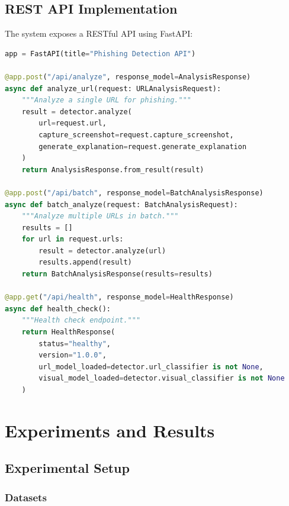 \documentclass[12pt,a4paper]{report}
\begin{document}
\section{REST API Implementation}

The system exposes a RESTful API using FastAPI:

\begin{lstlisting}[language=Python, caption=FastAPI Endpoints]
app = FastAPI(title="Phishing Detection API")

@app.post("/api/analyze", response_model=AnalysisResponse)
async def analyze_url(request: URLAnalysisRequest):
    """Analyze a single URL for phishing."""
    result = detector.analyze(
        url=request.url,
        capture_screenshot=request.capture_screenshot,
        generate_explanation=request.generate_explanation
    )
    return AnalysisResponse.from_result(result)

@app.post("/api/batch", response_model=BatchAnalysisResponse)
async def batch_analyze(request: BatchAnalysisRequest):
    """Analyze multiple URLs in batch."""
    results = []
    for url in request.urls:
        result = detector.analyze(url)
        results.append(result)
    return BatchAnalysisResponse(results=results)

@app.get("/api/health", response_model=HealthResponse)
async def health_check():
    """Health check endpoint."""
    return HealthResponse(
        status="healthy",
        version="1.0.0",
        url_model_loaded=detector.url_classifier is not None,
        visual_model_loaded=detector.visual_classifier is not None
    )
\end{lstlisting}

\chapter{Experiments and Results}

\section{Experimental Setup}

\subsection{Datasets}
\end{document}
